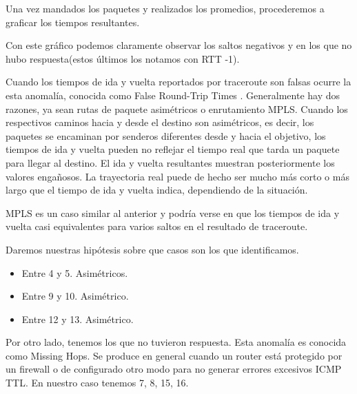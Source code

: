 Una vez mandados los paquetes y realizados los promedios, procederemos a graficar los tiempos resultantes.


\begin{figure}[H]
    \centering
\end{figure}

Con este gráfico podemos claramente observar los saltos negativos y en los que no hubo respuesta(estos
últimos los notamos con RTT -1).

Cuando los tiempos de ida y vuelta reportados por traceroute son falsas ocurre la esta anomalía, conocida
como False Round-Trip Times . Generalmente hay dos razones, ya sean rutas de paquete asimétricos o enrutamiento
MPLS. Cuando los respectivos caminos hacia y desde el destino son asimétricos, es decir, los paquetes se
encaminan por senderos diferentes desde y hacia el objetivo, los tiempos de ida y vuelta pueden no
reflejar el tiempo real que tarda un paquete para llegar al destino. El ida y vuelta resultantes muestran
posteriormente los valores engañosos. La trayectoria real puede de hecho ser mucho más corto o más largo
que el tiempo de ida y vuelta indica, dependiendo de la situación.

MPLS es un caso similar al anterior y podría verse en que los tiempos de ida y vuelta casi equivalentes
para varios saltos en el resultado de traceroute.

Daremos nuestras hipótesis sobre que casos son los que identificamos.

\begin{itemize}
\item Entre 4 y 5. Asimétricos.
\item Entre 9 y 10. Asimétrico.
\item Entre 12 y 13. Asimétrico.
\end{itemize}

Por otro lado, tenemos los que no tuvieron respuesta. Esta anomalía es conocida como Missing Hops.
Se produce en general cuando un router está protegido por un firewall o de configurado otro modo para no
generar errores excesivos ICMP TTL. En nuestro caso tenemos 7, 8, 15, 16.

